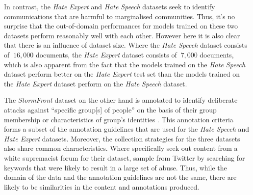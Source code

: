 In contrast, the \textit{Hate Expert} and \textit{Hate Speech} datasets seek to identify communications that are harmful to marginalised communities. Thus, it's no surprise that the out-of-domain performances for models trained on these two datasets perform reasonably well with each other. However here it is also clear that there is an influence of dataset size. Where the \textit{Hate Speech} dataset consists of $~16,000$ documents, the \textit{Hate Expert} dataset consists of $~7,000$ documents, which is also apparent from the fact that the models trained on the \textit{Hate Speech} dataset perform better on the \textit{Hate Expert} test set than the models trained on the \textit{Hate Expert} dataset perform on the \textit{Hate Speech} dataset.

The \textit{StormFront} dataset on the other hand is annotated to identify deliberate attacks against ``specific group[s] of people'' on the basis of their group membership or characteristics of group's identities \citep{Garcia:2019}. This annotation criteria forms a subset of the annotation guidelines that are used for the \textit{Hate Speech} and \textit{Hate Expert} datasets. Moreover, the collection strategies for the three datasets also share common characteristics. Where \citet{Garcia:2019} specifically seek out content from a white supremacist forum for their dataset, \citet{Waseem:2016,Waseem-Hovy:2016} sample from Twitter by searching for keywords that were likely to result in a large set of abuse. Thus, while the domain of the data and the annotation guidelines are not the same, there are likely to be similarities in the content and annotations produced.

